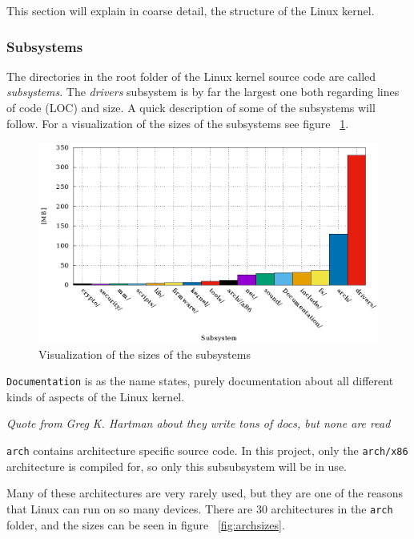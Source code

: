 \documentclass[a4paper,11pt]{article}
\newcommand{\textcode}[1]{
    \fboxsep=1pt
    \texttt{\colorbox{gray!20}{#1}}
}
\newcommand{\figa}{
    \begin{figure}[!htpb]
    \centering
}
\newcommand{\figb}[2]{
    \caption{#1}
    \label{#2}
    \end{figure}
}
\begin{document}
This section will explain in coarse detail, the structure of the Linux kernel.


        \subsubsection{Subsystems}

The directories in the root folder of the Linux kernel source code are called 
\emph{subsystems}. The \emph{drivers} subsystem is by far the largest one both 
regarding lines of code (LOC) and size. A quick description of some of the subsystems will follow. 
For a visualization of the sizes of the subsystems see figure 
~\ref{fig:subsystems}.


\figa
    \includegraphics{plots/subsystemsizes.eps}
\figb{Visualization of the sizes of the subsystems}{fig:subsystems}


\textcode{Documentation} is as the name states, purely documentation about all 
different kinds of aspects of the Linux kernel.

\begin{center}
    \emph{Quote from Greg K. Hartman about they write tons of docs, but none 
    are read}
\end{center}


\textcode{arch} contains architecture specific source code. In this project, 
only the \textcode{arch/x86} architecture is compiled for, so only this 
subsubsystem will be in use. 

Many of these architectures are very rarely used, but they are one of the 
reasons that Linux can run on so many devices. There are 30 architectures in 
the \textcode{arch} folder, and the sizes can be seen in figure ~\ref{fig:archsizes}.
\end{document}
